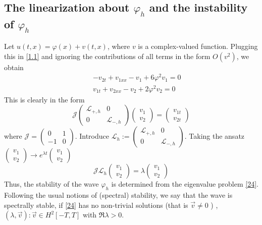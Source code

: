 \documentclass[12pt]{amsart}
\theoremstyle{definition}
\theoremstyle{remark}
\numberwithin{equation}{section}
\renewcommand{\(}{\left(}
\renewcommand{\)}{\right)}
\renewcommand{\[}{\left[}
\renewcommand{\]}{\right]}
\newcommand{\cl}{{\mathcal L}}
\newcommand{\la}{\lambda}
\newcommand{\vp}{\varphi}
\newcommand{\cj}{{\mathcal J}}
\begin{document}
 \subsection{The linearization about $\vp_h$ and the instability  of $\vp_h$ }
 Let $u(t,x)=\varphi(x)+v(t,x)$, where $v$ is a complex-valued function. Plugging  this in \eqref{1.1} and ignoring the contributions of all terms in the form $O(v^2)$, we obtain
 \begin{eqnarray*}
 & & -v_{2t}+v_{1xx}-v_1+6\varphi^2v_1 = 0 \\
& &      v_{1t}+v_{2xx}-v_2+2\varphi^2v_2=0
 \end{eqnarray*}
 This is clearly in the form
  $$
     \cj \left( \begin{array}{ll} \cl_{+,h} & 0 \\0  & \cl_{-,h} \end{array} \right)\left( \begin{array}{ll} v_{1}\\ v_{2} \end{array} \right)= \left( \begin{array}{ll} v_{1t} \\ v_{2t} \end{array} \right)
     $$
      where $\cj=\left( \begin{array}{ll} 0 & 1 \\ -1&0 \end{array} \right)$. Introduce
      $\cl_h:=\left( \begin{array}{ll} \cl_{+,h} & 0 \\0  & \cl_{-,h} \end{array} \right) $.
Taking the ansatz $ \left( \begin{array}{ll} v_{1}\\ v_{2} \end{array} \right)\to e^{\la t} \left( \begin{array}{ll} v_{1}\\ v_{2} \end{array} \right)$
    \begin{equation}
    \label{24}
    \cj\cl_h \left( \begin{array}{ll} v_{1}\\ v_{2} \end{array} \right)= \la \left( \begin{array}{ll} v_{1}\\ v_{2} \end{array} \right)
    \end{equation}
 Thus, the stability of the wave $\vp_h$  is determined from the eigenvalue problem \eqref{24}.
 Following the usual notions of (spectral) stability, we say that the wave is spectrally stable, if \eqref{24} has no non-trivial solutions (that is $\vec{v} \neq 0$ ) ,
 $(\la, \vec{v}): \vec{v}\in H^2[-T,T]$ with $\Re\la>0$.
\end{document}
